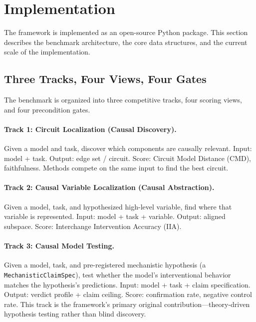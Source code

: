 \documentclass[10pt]{article}
\begin{document}
\section{Implementation}
\label{sec:implementation}

The framework is implemented as an open-source Python package. This section describes the benchmark architecture, the core data structures, and the current scale of the implementation.

\subsection{Three Tracks, Four Views, Four Gates}
\label{sec:3t4v4g}

The benchmark is organized into three competitive tracks, four scoring views, and four precondition gates.

\paragraph{Track 1: Circuit Localization (Causal Discovery).} Given a model and task, discover which components are causally relevant. Input: model + task. Output: edge set / circuit. Score: Circuit Model Distance (CMD), faithfulness. Methods compete on the same input to find the best circuit.

\paragraph{Track 2: Causal Variable Localization (Causal Abstraction).} Given a model, task, and hypothesized high-level variable, find where that variable is represented. Input: model + task + variable. Output: aligned subspace. Score: Interchange Intervention Accuracy (IIA).

\paragraph{Track 3: Causal Model Testing.} Given a model, task, and pre-registered mechanistic hypothesis (a \texttt{MechanisticClaimSpec}), test whether the model's interventional behavior matches the hypothesis's predictions. Input: model + task + claim specification. Output: verdict profile + claim ceiling. Score: confirmation rate, negative control rate. This track is the framework's primary original contribution---theory-driven hypothesis testing rather than blind discovery.
\end{document}
